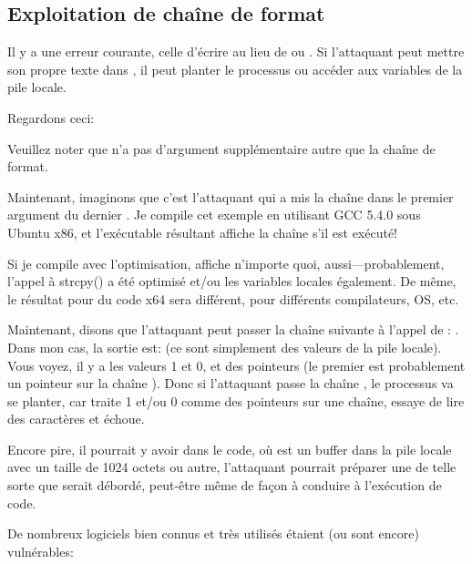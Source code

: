 \subsection{Exploitation de chaîne de format}

Il y a une erreur courante, celle d'écrire  au lieu de 
ou .
Si l'attaquant peut mettre son propre texte dans , il peut planter le
processus ou accéder aux variables de la pile locale.

Regardons ceci:



Veuillez noter que \printf n'a pas d'argument supplémentaire autre que la chaîne
de format.

Maintenant, imaginons que c'est l'attaquant qui a mis la chaîne  dans le
premier argument du dernier \printf.
Je compile cet exemple en utilisant GCC 5.4.0 sous Ubuntu x86, et l'exécutable résultant
affiche la chaîne  s'il est exécuté!

Si je compile avec l'optimisation, \printf affiche n'importe quoi, aussi---probablement,
l'appel à strcpy() a été optimisé et/ou les variables locales également.
De même, le résultat pour du code x64 sera différent, pour différents compilateurs,
\ac{OS}, etc.

Maintenant, disons que l'attaquant peut passer la chaîne suivante à l'appel de \printf:
.
Dans mon cas, la sortie est:  (ce sont simplement
des valeurs de la pile locale).
Vous voyez, il y a les valeurs 1 et 0, et des pointeurs (le premier est probablement
un pointeur sur la chaîne ).
Donc si l'attaquant passe la chaîne , le processus va se
planter, car \printf traite 1 et/ou 0 comme des pointeurs sur une chaîne, essaye
de lire des caractères et échoue.

Encore pire, il pourrait y avoir  dans le code, où 
est un buffer dans la pile locale avec un taille de 1024 octets ou autre, l'attaquant
pourrait préparer une  de telle sorte que  serait débordé, peut-être
même de façon à conduire à l'exécution de code.

De nombreux logiciels bien connus et très utilisés étaient (ou sont encore) vulnérables:

